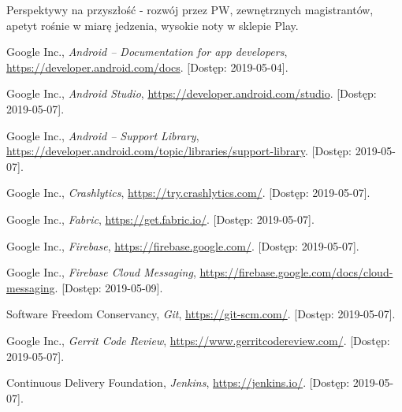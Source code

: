 \documentclass{pracamgr}
\begin{document}
Perspektywy na przyszłość - rozwój przez PW, zewnętrznych magistrantów, apetyt rośnie w miarę jedzenia, wysokie noty w sklepie Play.

\appendix

\cleardoublepage
{}
{}
\listoffigures

\cleardoublepage
{}
{}
\listoftables


\begin{thebibliography}{99}


 Google Inc., \textit{Android -- Documentation for app developers},
	 \url{https://developer.android.com/docs}. [Dostęp: 2019-05-04].

 Google Inc., \textit{Android Studio},
	\url{https://developer.android.com/studio}. [Dostęp: 2019-05-07].

 Google Inc., \textit{Android -- Support Library},
	\url{https://developer.android.com/topic/libraries/support-library}. [Dostęp: 2019-05-07].

 Google Inc., \textit{Crashlytics}, \url{https://try.crashlytics.com/}. [Dostęp: 2019-05-07].

 Google Inc., \textit{Fabric}, \url{https://get.fabric.io/}. [Dostęp: 2019-05-07].

 Google Inc., \textit{Firebase}, \url{https://firebase.google.com/}. [Dostęp: 2019-05-07].

 Google Inc., \textit{Firebase Cloud Messaging},
	\url{https://firebase.google.com/docs/cloud-messaging}. [Dostęp: 2019-05-09].

 Software Freedom Conservancy, \textit{Git},
	\url{https://git-scm.com/}. [Dostęp: 2019-05-07].

 Google Inc., \textit{Gerrit Code Review},
	\url{https://www.gerritcodereview.com/}. [Dostęp: 2019-05-07].

 Continuous Delivery Foundation, \textit{Jenkins},
	\url{https://jenkins.io/}. [Dostęp: 2019-05-07].


\end{thebibliography}
\end{document}
